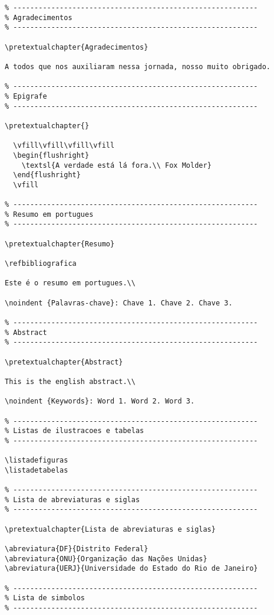 \documentclass[a4paper,12pt,oneside,onecolumn]{article}
\begin{document}
\begin{verbatim}
% ----------------------------------------------------------
% Agradecimentos
% ----------------------------------------------------------

\pretextualchapter{Agradecimentos}

A todos que nos auxiliaram nessa jornada, nosso muito obrigado.

% ----------------------------------------------------------
% Epigrafe
% ----------------------------------------------------------

\pretextualchapter{}

  \vfill\vfill\vfill\vfill
  \begin{flushright}
    \textsl{A verdade está lá fora.\\ Fox Molder}
  \end{flushright}
  \vfill

% ----------------------------------------------------------
% Resumo em portugues
% ----------------------------------------------------------

\pretextualchapter{Resumo}

\refbibliografica

Este é o resumo em portugues.\\

\noindent {Palavras-chave}: Chave 1. Chave 2. Chave 3.

% ----------------------------------------------------------
% Abstract
% ----------------------------------------------------------

\pretextualchapter{Abstract}

This is the english abstract.\\

\noindent {Keywords}: Word 1. Word 2. Word 3.

% ----------------------------------------------------------
% Listas de ilustracoes e tabelas
% ----------------------------------------------------------

\listadefiguras
\listadetabelas

% ----------------------------------------------------------
% Lista de abreviaturas e siglas
% ----------------------------------------------------------

\pretextualchapter{Lista de abreviaturas e siglas}

\abreviatura{DF}{Distrito Federal}
\abreviatura{ONU}{Organização das Nações Unidas}
\abreviatura{UERJ}{Universidade do Estado do Rio de Janeiro}

% ----------------------------------------------------------
% Lista de simbolos
% ----------------------------------------------------------


\end{verbatim}
\end{document}
